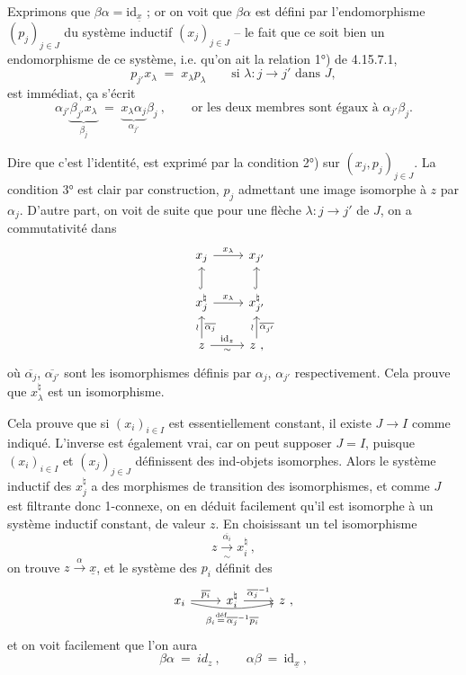 \documentclass[11pt]{article}
\newcommand{\printedpage}[1]{\marginpar{\footnotesize p.~#1}}
\newcommand{\msp}[1]{\marginpar{\footnotesize [#1]}}
\newcommand{\id}{\mathrm{id}}
\newcommand{\ux}{\underline{x}}
\begin{document}
Exprimons que $\beta\alpha = \id_{\ux}$ ; or on voit que $\beta\alpha$ est défini par l'endomorphisme $(p_j)_{j\in J}$ du système inductif $(x_j)_{j\in J}$ -- le fait que ce soit bien un endomorphisme de ce système, i.e. qu'on ait la relation 1°) de 4.15.7.1,
\[
p_{j'}x_\lambda \;=\; x_\lambda p_\lambda \qquad \text{si } \lambda : j \longrightarrow j' \text{ dans } J, %
\]
est immédiat, ça s'écrit
\[
\alpha_{j'}\underbrace{\beta_{j'}x_\lambda}_{\beta_j} \;=\; \underbrace{x_\lambda\alpha_j}_{\alpha_{j'}}\beta_j\ , \qquad \text{or les deux membres sont égaux à } \alpha_{j'}\beta_j.
\]

\printedpage{174}

\msp{page 451}
Dire que c'est l'identité, est exprimé par la condition 2°) sur $(x_j,p_j)_{j\in J}$. La condition 3° est clair par construction, $p_j$ admettant une image isomorphe à $z$ par $\alpha_j$. D'autre part, on voit de suite que pour une flèche $\lambda : j \longrightarrow j'$ de $J$, on a commutativité dans %
\[
\begin{tikzcd}
x_j \arrow[r, "x_\lambda"] & x_{j'} \\
x_j^\natural \arrow[u, hook] \arrow[r, "x_\lambda"] & x_{j'}^\natural \arrow[u, hook] \\
z \arrow[u, "\wr", "\overline{\alpha_j}"'] \arrow[r, "\mathrm{id}_z", "\sim"'] & z \ , \arrow[u, "\wr", "\overline{\alpha_{j'}}"']
\end{tikzcd}
\]
où $\overline{\alpha_j}$, $\overline{\alpha_{j'}}$ sont les isomorphismes définis par $\alpha_j$, $\alpha_{j'}$ respectivement. Cela prouve que $x_\lambda^\natural$ est un isomorphisme.

Cela prouve que si $(x_i)_{i\in I}$ est essentiellement constant, il existe $J\longrightarrow I$ comme indiqué. L'inverse est également vrai, car on peut supposer $J = I$, puisque $(x_i)_{i\in I}$ et $(x_j)_{j\in J}$ définissent des ind-objets isomorphes. Alors le système inductif des $x_j^\natural$ a des morphismes de transition des isomorphismes, et comme $J$ est filtrante donc 1-connexe, on en déduit facilement qu'il est isomorphe
\msp{page 452}
à un système inductif constant, de valeur $z$. En choisissant un tel isomorphisme
\[
z \xrightarrow[\sim]{\overline{\alpha_i}} x_i^\natural \ ,
\]
on trouve $z \xrightarrow{\alpha} \underline{x}$, et le système des $p_i$ définit des
\[
\begin{tikzcd}
x_i \arrow[r, "\overline{p_i}"] \arrow[rr, bend right=12, "\beta_i \overset{\text{déf}}{=} \overline{\alpha_j}^{-1}\overline{p_i}"'] & x_i^\natural \arrow[r, "\overline{\alpha_j}^{-1}"] & z \ ,
\end{tikzcd}
\] %
et on voit facilement que l'on aura
\[
\beta\alpha \ = \ id_z \ , \qquad \alpha\beta \ = \ \mathrm{id}_{\underline{x}} \ ,
\]
\end{document}
